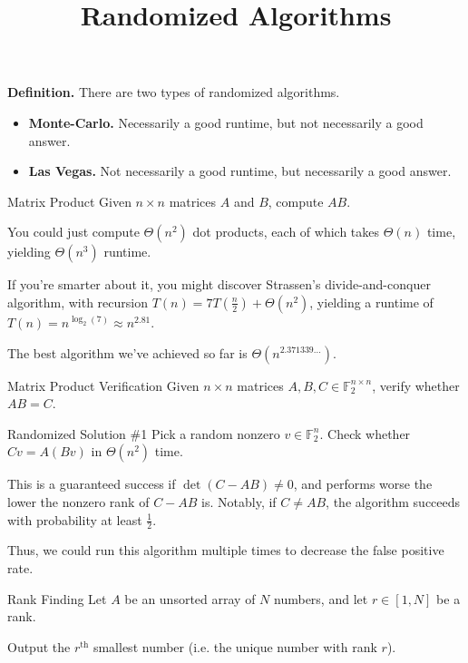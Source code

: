 \title{Randomized Algorithms}



\textbf{Definition.} There are two types of randomized algorithms.
\begin{itemize}
    \item \textbf{Monte-Carlo.} Necessarily a good runtime, but not necessarily a good answer.
    \item \textbf{Las Vegas.} Not necessarily a good runtime, but necessarily a good answer.
\end{itemize}

\begin{problem}{Matrix Product}
    Given $n \times n$ matrices $A$ and $B$, compute $AB$.
\end{problem}

You could just compute $\Theta(n^2)$ dot products, each of which takes $\Theta(n)$ time, yielding $\Theta(n^3)$ runtime.

\begin{remark}
    If you're smarter about it, you might discover Strassen's divide-and-conquer algorithm, with recursion $T(n) = 7T\left(\frac{n}{2}\right) + \Theta(n^2)$, yielding a runtime of $T(n) = n^{\log_2(7)} \approx n^{2.81}$.
    
    The best algorithm we've achieved so far is $\Theta(n^{2.371339\dots})$.
\end{remark}

\begin{problem}{Matrix Product Verification}
Given $n \times n$ matrices $A, B, C \in \mathbb{F}_2^{n \times n}$, verify whether $AB = C$.
\end{problem}

\begin{solution}{Randomized Solution \#1}
    Pick a random nonzero $v \in \mathbb{F}_2^n$.  Check whether $Cv = A(Bv)$ in $\Theta(n^2)$ time.
\end{solution}

This is a guaranteed success if $\det(C - AB) \neq 0$, and performs worse the lower the nonzero rank of $C - AB$ is.  Notably, if $C \neq AB$, the algorithm succeeds with probability at least $\frac{1}{2}$.

Thus, we could run this algorithm multiple times to decrease the false positive rate.

\begin{problem}{Rank Finding}
    Let $A$ be an unsorted array of $N$ numbers, and let $r \in [1, N]$ be a rank.
    
    Output the $r^{\text{th}}$ smallest number (i.e. the unique number with rank $r$).
\end{problem}

